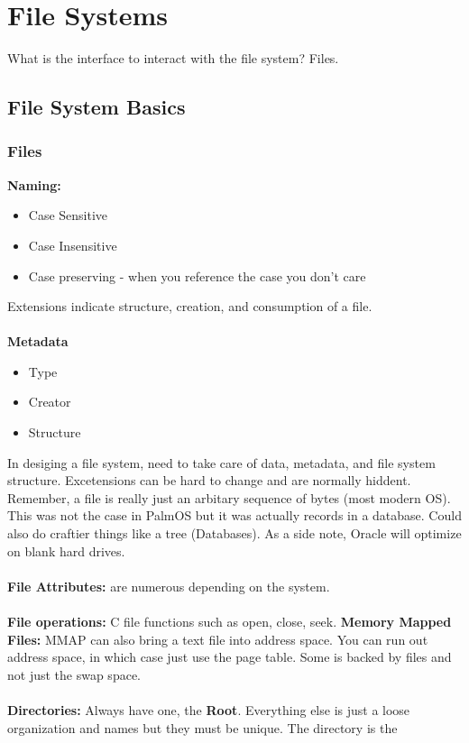 \documentclass[../base_file/cs1550_notes.tex]{subfiles}
\begin{document}
\chapter{File Systems}
What is the interface to interact with the file system? Files.
\section{File System Basics}
\subsection{Files}
\textbf{Naming:}
\begin{itemize}
	\item Case Sensitive
	\item Case Insensitive
	\item Case preserving - when you reference the case you don't care
\end{itemize}
Extensions indicate structure, creation, and consumption of a file.\\\\
\textbf{Metadata}
\begin{itemize}
		\item Type
		\item Creator
		\item Structure
\end{itemize}
In desiging a file system, need to take care of data, metadata, and file
system structure.  Excetensions can be hard to change and are normally
hiddent.  Remember, a file is really just an arbitary sequence of bytes 
(most modern OS).  This was not the case in PalmOS but it was actually
records in a database.  Could also do craftier things like a tree
(Databases). As a side note, Oracle will optimize on blank hard drives.\\\\
\textbf{File Attributes:} are numerous depending on the system.\\\\
\textbf{File operations:} C file functions such as open, close, seek. 
\textbf{Memory Mapped Files:} MMAP can also bring a text file into 
address space.  You can run out address space, in which case just
use the page table.  Some is backed by files and not just the
swap space.\\\\
\textbf{Directories:}
Always have one, the \textbf{Root}.  Everything else is just a loose
organization and names but they must be unique.  The directory is the
\end{document}
